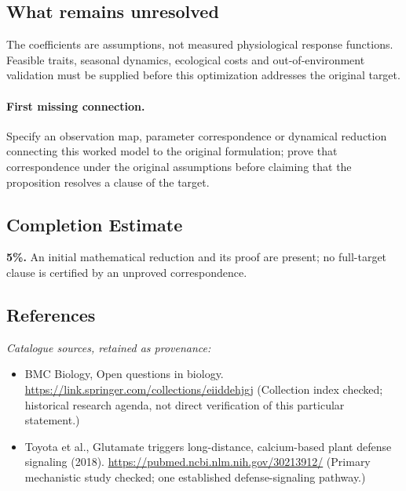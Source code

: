 \documentclass[11pt]{article}
\begin{document}
\subsection{What remains unresolved}
The coefficients are assumptions, not measured physiological response functions. Feasible traits, seasonal dynamics, ecological costs and out-of-environment validation must be supplied before this optimization addresses the original target.
\paragraph{First missing connection.} Specify an observation map, parameter correspondence or dynamical reduction connecting this worked model to the original formulation; prove that correspondence under the original assumptions before claiming that the proposition resolves a clause of the target.
\subsection{Completion Estimate}
\textbf{5\%.} An initial mathematical reduction and its proof are present; no full-target clause is certified by an unproved correspondence.
\subsection{References}
\noindent\emph{Catalogue sources, retained as provenance:}
\begin{itemize}
\item BMC Biology, Open questions in biology. \url{https://link.springer.com/collections/eiiddehjgj} (Collection index checked; historical research agenda, not direct verification of this particular statement.)
\item Toyota et al., Glutamate triggers long-distance, calcium-based plant defense signaling (2018). \url{https://pubmed.ncbi.nlm.nih.gov/30213912/} (Primary mechanistic study checked; one established defense-signaling pathway.)
\end{itemize}
\clearpage


\appendix
\end{document}
